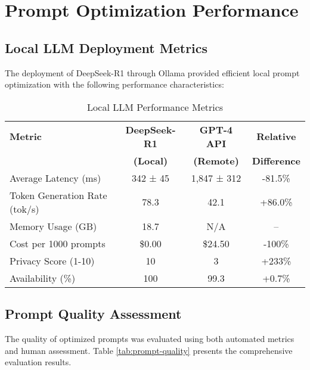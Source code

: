 \section{Prompt Optimization Performance}
\label{sec:prompt-optimization}

\subsection{Local LLM Deployment Metrics}

The deployment of DeepSeek-R1 through Ollama provided efficient local prompt optimization with the following performance characteristics:

\begin{table}[h!]
\centering
\caption{Local LLM Performance Metrics}
\label{tab:llm-performance}
\begin{tabular}{|l|c|c|c|}
\hline
\textbf{Metric} & \textbf{DeepSeek-R1} & \textbf{GPT-4 API} & \textbf{Relative} \\
                & \textbf{(Local)} & \textbf{(Remote)} & \textbf{Difference} \\
\hline
Average Latency (ms) & 342 ± 45 & 1,847 ± 312 & -81.5\% \\
Token Generation Rate (tok/s) & 78.3 & 42.1 & +86.0\% \\
Memory Usage (GB) & 18.7 & N/A & -- \\
Cost per 1000 prompts & \$0.00 & \$24.50 & -100\% \\
Privacy Score (1-10) & 10 & 3 & +233\% \\
Availability (\%) & 100 & 99.3 & +0.7\% \\
\hline
\end{tabular}
\end{table}

\subsection{Prompt Quality Assessment}

The quality of optimized prompts was evaluated using both automated metrics and human assessment. Table \ref{tab:prompt-quality} presents the comprehensive evaluation results.

